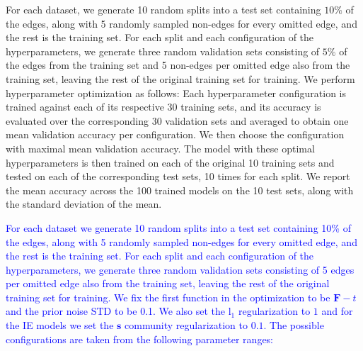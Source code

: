 \documentclass{article}
\theoremstyle{plain}
\theoremstyle{definition}
\theoremstyle{remark}
\newcommand{\dan}[1]{{{\textcolor{blue}{ {#1}\textbf{}}}}}
\begin{document}
For each dataset, we generate 10 random splits into a test set  containing $10\%$ of the edges, along with 5 randomly sampled non-edges for every omitted edge, and the rest is the training set. For each split and each configuration of the hyperparameters, we generate three random validation sets consisting of $5\%$ of the edges from the training set and 5  non-edges per omitted edge also from the training set, leaving the rest of the original training set for training.  We perform hyperparameter optimization as follows: Each hyperparameter configuration is trained against each of its respective 30 training sets, and its accuracy is evaluated over the corresponding 30 validation sets and averaged to obtain one mean validation accuracy per configuration. We then choose the configuration with maximal mean validation accuracy. The model with these optimal hyperparameters  is then trained on each of the original 10 training sets and tested on each of the corresponding test sets, 10 times for each split. We report the mean accuracy across the 100 trained models on the 10 test sets, along with the standard deviation of the mean. 

\dan{
For each dataset we generate 10 random splits into a test set containing 10\% of the edges, along with 5 randomly sampled non-edges for every omitted edge, and the rest is the training set. For each split and each configuration of the
hyperparameters, we generate three random validation sets
consisting of 5%
edges per omitted edge also from the training set, leaving
the rest of the original training set for training. 
We fix the first function in the optimization to be $\mathbf{F} - t$ and the prior noise STD to be 0.1. We also set the l${_1}$ regularization to $1$ and for the IE models we set the $\mathbf{s}$ community regularization to $0.1$. The possible configurations are taken from the following parameter ranges: 
}
\end{document}
